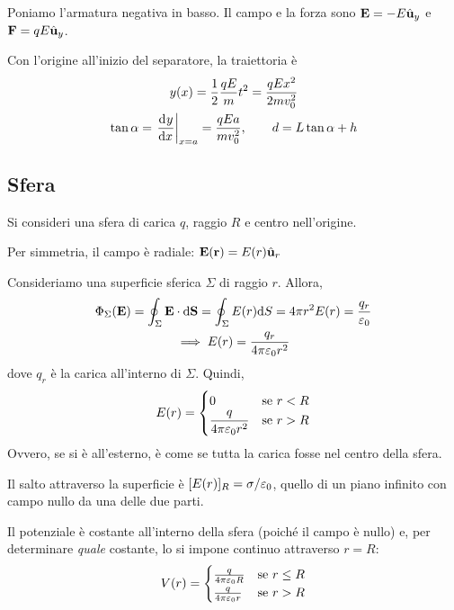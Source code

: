 Poniamo l'armatura negativa in basso.
Il campo e la forza sono $\mathbf{E} = -E \hat{\mathbf{u}}_{y}$ e $\mathbf{F} = q E \hat{\mathbf{u}}_{y}$.

Con l'origine all'inizio del separatore, la traiettoria è
\begin{gather}
    y(x) = \frac{1}{2} \frac{q E}{m} t^2 = \frac{q E x^2}{2 m v_0^2} \\
    \tan \alpha = \evalat{\der[y]{x}}{x = a} = \frac{q E a}{m v_0^2}, \qquad d = L \tan \alpha + h
\end{gather}

\subsection{Sfera}

Si consideri una sfera di carica $q$, raggio $R$ e centro nell'origine.

Per simmetria, il campo è radiale: $\mathbf{E}(\mathbf{r}) = E(r)\hat{\mathbf{u}}_{r}$

Consideriamo una superficie sferica $\Sigma$ di raggio $r$.
Allora,
\begin{equation}
\begin{gathered}
    \Phi_\Sigma(\mathbf{E}) = \oint_\Sigma \mathbf{E} \cdot \mathrm{d} \mathbf{S} = \oint_\Sigma E(r) \mathrm{d} S= 4\pi r^2 E(r) = \frac{q_r}{\varepsilon_0} \\
    \implies E(r) = \frac{q_r}{4\pi\varepsilon_0 r^2}
\end{gathered}
\end{equation}
dove $q_r$ è la carica all'interno di $\Sigma$.
Quindi,
\begin{equation}
    E(r) = \begin{cases}
        0 & \text{se } r < R \\
        \dfrac{q}{4\pi\varepsilon_0 r^2} & \text{se } r > R
    \end{cases}
\end{equation}
Ovvero, se si è all'esterno, è come se tutta la carica fosse nel centro della sfera.

Il salto attraverso la superficie è $[E(r)]_R = \sigma/\varepsilon_0$, quello di un piano infinito con campo nullo da una delle due parti.

Il potenziale è costante all'interno della sfera (poiché il campo è nullo) e, per determinare \textit{quale} costante, lo si impone continuo attraverso $r = R$:
\begin{equation}
\label{eq:potenziale_sfera}
    V(r) = \begin{cases}
        \frac{q}{4\pi\varepsilon_0 R} & \text{se } r \le R \\
        \frac{q}{4\pi\varepsilon_0 r} & \text{se } r > R
    \end{cases}
\end{equation}


